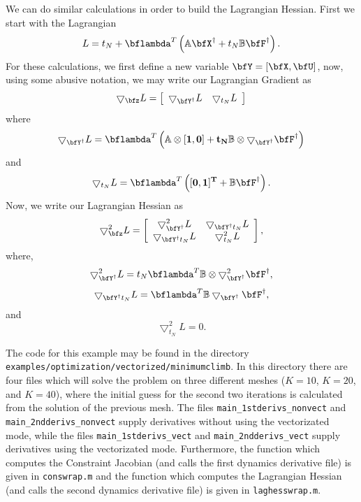 \documentclass[10pt,pdftex]{article}
\begin{document}
We can do similar calculations in order to build the Lagrangian Hessian. First we start with the Lagrangian
\begin{equation}
L = t_N + \bflambda^T\left(\mathbb{A}\bfX^{\dag} + t_N\mathbb{B}\bfF^{\dag}\right).
\end{equation}
For these calculations, we first define a new variable $\bfY = [\bfX, \bfU]$, now, using some abusive notation, we may write our Lagrangian Gradient as
\begin{equation}
\bigtriangledown _{\bfz} L = 
\left[ \begin{array}{cc}
\bigtriangledown _{\bfY^{\dag}} L & \bigtriangledown _{t_N} L
\end{array}\right]
\end{equation}
where
\begin{equation}
\bigtriangledown _{\bfY^{\dag}} L = \bflambda^T\left(\mathbb{A}\otimes[\bf1, \bf0] + t_N\mathbb{B}\otimes \bigtriangledown _{\bfY^{\dag}} \bfF^{\dag}\right)
\end{equation}
and
\begin{equation}
\bigtriangledown _{t_N} L = \bflambda ^T\left([\bf0, 1]^T + \mathbb{B}\bfF^{\dag}\right).
\end{equation}
Now, we write our Lagrangian Hessian as
\begin{equation}
\bigtriangledown _{\bfz}^2 L = \left[
\begin{array}{cc}
\bigtriangledown _{\bfY^{\dag}}^2 L & \bigtriangledown _{\bfY^{\dag}t_N} L \\
\bigtriangledown _{\bfY^{\dag}t_N} L & \bigtriangledown _{t_N}^2 L 
\end{array} \right],
\end{equation}
where,
\begin{equation}
\bigtriangledown _{\bfY^{\dag}}^2 L  = t_N \bflambda ^T  \mathbb{B} \otimes \bigtriangledown _{\bfY^{\dag}}^2 \bfF^{\dag},
\end{equation}
\begin{equation}
\bigtriangledown _{\bfY^{\dag}t_N} L = \bflambda ^T \mathbb{B}\bigtriangledown_{\bfY^{\dag}} \bfF^{\dag},
\end{equation}
and
\begin{equation}
\bigtriangledown _{t_N}^2 L  = 0.
\end{equation}

The code for this example may be found in the directory \texttt{examples/optimization/vectorized/minimumclimb}. In this directory there are four files which will solve the problem on three different meshes ($K = 10$, $K = 20$, and $K = 40$), where the initial guess for the second two iterations is calculated from the solution of the previous mesh. The files \texttt{main\_1stderivs\_nonvect} and \texttt{main\_2ndderivs\_nonvect} supply derivatives without using the vectorizated mode, while the files \texttt{main\_1stderivs\_vect} and \texttt{main\_2ndderivs\_vect} supply derivatives using the vectorizated mode. Furthermore, the function which computes the Constraint Jacobian (and calls the first dynamics derivative file) is given in \texttt{conswrap.m} and the function which computes the Lagrangian Hessian (and calls the second dynamics derivative file) is given in \texttt{laghesswrap.m}.
\end{document}
